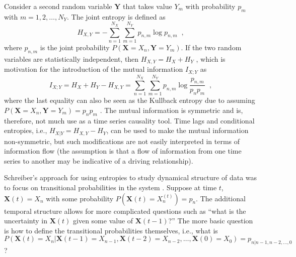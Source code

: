 \documentclass{article}[10pt]
\begin{document}
Consider a second random variable $\mathbf{Y}$ that takes value $Y_m$ with probability $p_m$ with $m = 1,2,\ldots,N_Y$.  The joint entropy is defined as
\begin{equation}
H_{X,Y} = -\sum_{n=1}^{N_X} \sum_{m=1}^{N_Y} p_{n,m} \log p_{n,m}\;\;,
\end{equation}
where $p_{n,m}$ is the joint probability $P(\mathbf{X}=X_n,\mathbf{Y}=Y_m)$.  If the two random variables are statistically independent, then $H_{X,Y} = H_X+H_Y$ \cite{Hlav2007}, which is motivation for the introduction of the mutual information $I_{X;Y}$ as
\begin{equation}
I_{X;Y} = H_X + H_Y - H_{X,Y} = \sum_{n=1}^{N_X} \sum_{m=1}^{N_Y} p_{n,m} \log \frac{p_{n,m}}{p_n p_m}\;\;,
\end{equation}
where the last equality can also be seen as the Kullback entropy due to assuming $P(\mathbf{X}=X_n,\mathbf{Y}=Y_m)=p_n p_m$ \cite{Kaiser2002}.  The mutual information is symmetric and is, therefore, not much use as a time series causality tool.  Time lags and conditional entropies, i.e., $H_{X|Y} = H_{X,Y} - H_{Y}$, can be used to make the mutual information non-symmetric, but such modifications are not easily interpreted in terms of information flow \cite{Schreiber2000} (the assumption is that a flow of information from one time series to another may be indicative of a driving relationship).  

Schreiber's approach for using entropies to study dynamical structure of data was to focus on transitional probabilities in the system \cite{Schreiber2000}.  Suppose at time $t$, $\mathbf{X}(t) = X_n$ with some probability $P(\mathbf{X}(t) = X_n^{(t)})=p_n$.  The additional temporal structure allows for more complicated questions such as ``what is the uncertainty in $\mathbf{X}(t)$ given some value of $\mathbf{X}(t-1)$?''  The more basic question is how to define the transitional probabilities themselves, i.e., what is $P(\mathbf{X}(t) = X_n | \mathbf{X}(t-1) = X_{n-1},\mathbf{X}(t-2) = X_{n-2},\ldots,\mathbf{X}(0) = X_{0}) = p_{n|n-1,n-2,\ldots,0}$?
\end{document}
